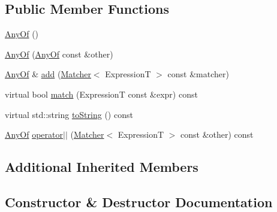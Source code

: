 \subsection*{Public Member Functions}
\begin{DoxyCompactItemize}
\item 
\hyperlink{class_catch_1_1_matchers_1_1_impl_1_1_generic_1_1_any_of_a131d84740c6b250ff7ef2213ae0de2aa}{Any\+Of} ()
\item 
\hyperlink{class_catch_1_1_matchers_1_1_impl_1_1_generic_1_1_any_of_a74fbc05b32d334fcbfd0fae0163a404e}{Any\+Of} (\hyperlink{class_catch_1_1_matchers_1_1_impl_1_1_generic_1_1_any_of}{Any\+Of} const \&other)
\item 
\hyperlink{class_catch_1_1_matchers_1_1_impl_1_1_generic_1_1_any_of}{Any\+Of} \& \hyperlink{class_catch_1_1_matchers_1_1_impl_1_1_generic_1_1_any_of_a3bce94b627551e5f96c5f9c6060413f0}{add} (\hyperlink{struct_catch_1_1_matchers_1_1_impl_1_1_matcher}{Matcher}$<$ ExpressionT $>$ const \&matcher)
\item 
virtual bool \hyperlink{class_catch_1_1_matchers_1_1_impl_1_1_generic_1_1_any_of_adebd5437cdb8e0d54e16e97fe26e7e85}{match} (ExpressionT const \&expr) const
\item 
virtual std\+::string \hyperlink{class_catch_1_1_matchers_1_1_impl_1_1_generic_1_1_any_of_a331aaf012b133682eadc9ed5342f848a}{to\+String} () const
\item 
\hyperlink{class_catch_1_1_matchers_1_1_impl_1_1_generic_1_1_any_of}{Any\+Of} \hyperlink{class_catch_1_1_matchers_1_1_impl_1_1_generic_1_1_any_of_a6dc9aee9a816f66ddc9de0c45c1c9ac1}{operator$\vert$$\vert$} (\hyperlink{struct_catch_1_1_matchers_1_1_impl_1_1_matcher}{Matcher}$<$ ExpressionT $>$ const \&other) const
\end{DoxyCompactItemize}
\subsection*{Additional Inherited Members}


\subsection{Constructor \& Destructor Documentation}
\hypertarget{class_catch_1_1_matchers_1_1_impl_1_1_generic_1_1_any_of_a131d84740c6b250ff7ef2213ae0de2aa}{}\label{class_catch_1_1_matchers_1_1_impl_1_1_generic_1_1_any_of_a131d84740c6b250ff7ef2213ae0de2aa} 
